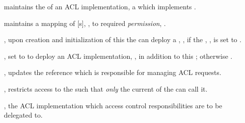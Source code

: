\begin{state}
  \item \attributes

  \begin{public}
    \item {} maintains the  of an ACL
      implementation, a  which implements .

    \item {} maintains a
      mapping of [s], , to required
      \emph{permission}, .
  \end{public}
\end{state}

\begin{code}
  \item \operations

  \begin{constructor}
    \item {}, upon creation and initialization
      of this  the  can deploy a
      , , if the , , is set to .

      \begin{parameters}
      \item {}, set to  to deploy an ACL
        implementation, , in addition to this
        ; otherwise .
      \end{parameters}
  \end{constructor}

  \begin{functions}
    \item {}, updates the
       reference which is responsible for managing ACL requests.

      \begin{modifiers}
        \item {}, restricts access to the
           such that \emph{only} the current  of the
           can call it.
      \end{modifiers}

      \begin{parameters}
        \item {}, the ACL implementation which access
          control responsibilities are to be delegated to.
      \end{parameters}


\end{functions}
\end{code}
